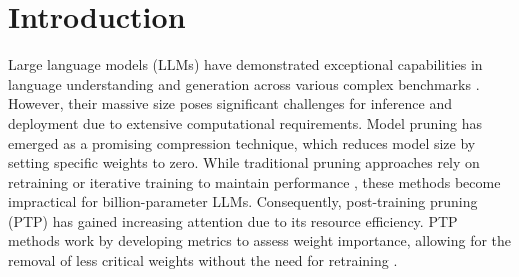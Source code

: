 \section{Introduction}
\label{sec:introduction}

Large language models (LLMs) \cite{achiam2023gpt, touvron2023llama, le2023bloom} have demonstrated exceptional capabilities in language understanding and generation across various complex benchmarks \cite{bubeck2023sparks, wei2022emergent, wei2022chain}. However, their massive size poses significant challenges for inference and deployment due to extensive computational requirements.
Model pruning has emerged as a promising compression technique, which reduces model size by setting specific weights to zero. While traditional pruning approaches rely on retraining or iterative training to maintain performance \cite{lecun1989optimal, hassibi1993optimal, han2015learning, liu2018rethinking, blalock2020state, frankle2018lottery, renda2019comparing}, these methods become impractical for billion-parameter LLMs. Consequently, post-training pruning (PTP) has gained increasing attention due to its resource efficiency. PTP methods work by developing metrics to assess weight importance, allowing for the removal of less critical weights without the need for retraining \cite{frantar2023sparsegpt, sun2023simple, zhangplug}.

